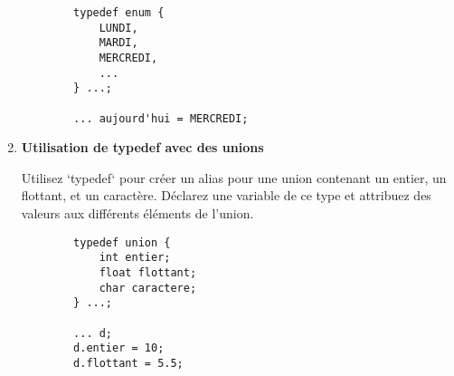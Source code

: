 \begin{enumerate}
	\begin{lstlisting}
		typedef enum {
			LUNDI,
			MARDI,
			MERCREDI,
			...
		} ...;
		
		... aujourd'hui = MERCREDI;
	\end{lstlisting}
	
	\item \textbf{Utilisation de typedef avec des unions}
	
	Utilisez `typedef` pour créer un alias pour une union contenant un entier, un flottant, et un caractère. Déclarez une variable de ce type et attribuez des valeurs aux différents éléments de l'union.
	
	\begin{lstlisting}
		typedef union {
			int entier;
			float flottant;
			char caractere;
		} ...;
		
		... d;
		d.entier = 10;
		d.flottant = 5.5;
	\end{lstlisting}
\end{enumerate}
